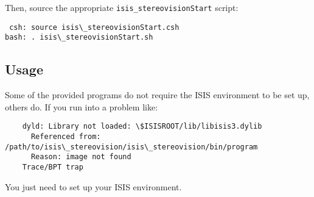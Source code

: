 Then, source the appropriate \texttt{isis\_stereovisionStart} script:
\begin{verbatim}
 csh: source isis\_stereovisionStart.csh
bash: . isis\_stereovisionStart.sh
\end{verbatim}

\subsection*{Usage}

Some of the provided programs do not require the ISIS environment
to be set up, others do.  If you run into a problem like:
\begin{verbatim}
    dyld: Library not loaded: \$ISISROOT/lib/libisis3.dylib
      Referenced from: /path/to/isis\_stereovision/isis\_stereovision/bin/program
      Reason: image not found
    Trace/BPT trap
\end{verbatim}

You just need to set up your ISIS environment.

